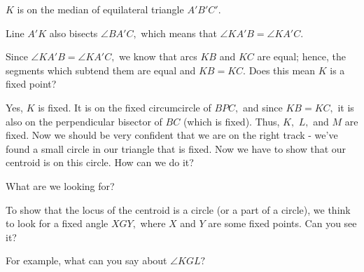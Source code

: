 $K$ is on the median of equilateral triangle $A'B'C'.$

Line $A'K$ also bisects $\angle BA'C,$ which means that $\angle KA'B = \angle KA'C.$

Since $\angle KA'B = \angle KA'C,$ we know that arcs $KB$ and $KC$ are equal; hence, the segments which subtend them are equal and $KB = KC.$ Does this mean $K$ is a fixed point?





Yes, $K$ is fixed. It is on the fixed circumcircle of $BPC,$ and since $KB = KC,$ it is also on the perpendicular bisector of $BC$ (which is fixed). Thus, $K,$ $L,$ and $M$ are fixed. Now we should be very confident that we are on the right track - we've found a small circle in our triangle that is fixed. Now we have to show that our centroid is on this circle. How can we do it?

What are we looking for?




To show that the locus of the centroid is a circle (or a part of a circle), we think to look for a fixed angle $XGY,$ where $X$ and $Y$ are some fixed points. Can you see it?

For example, what can you say about $\angle KGL?$



